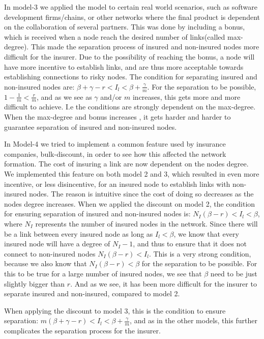 In model-3 we applied the model to certain real world scenarios, such as software development firms/chains, or other networks where the final product is dependent on the collaboration of several partners.
This was done by including a bonus, which is received when a node reach the desired number of links(called max-degree). This made the separation process of insured and non-insured nodes more difficult for the insurer. Due to the possibility of reaching the bonus, a node will have more incentive to establish links, and are thus more acceptable towards establishing connections to risky nodes. The condition for separating insured and non-insured nodes are: $\beta+\gamma-r<I_{l}<\beta+\frac{\gamma}{m}$. For the separation to be possible, $1-\frac{1}{m}<\frac{r}{m}$, and as we see as $\gamma$ and/or $m$ increases, this gets more and more difficult to achieve. 
I.e the conditions are strongly dependent on the max-degree. When the max-degree and bonus increases , it gets harder and harder to guarantee separation of insured and non-insured nodes. 

In Model-4 we tried to implement a common feature used by insurance companies, bulk-discount, in order to see how this affected the network formation. The cost of insuring a link are now dependent on the nodes degree. We implemented this feature on both model 2 and 3, which resulted in even more incentive, or less disincentive, for an insured node to establish links with non-insured nodes. The reason is intuitive since the cost of doing so decreases as the nodes degree increases. 
When we applied the discount on model 2, the condition for ensuring separation of insured and non-insured nodes is: $N_{I}(\beta-r)<I_{l}<\beta$, where $N_{I}$ represents the number of insured nodes in the network. Since there will be a link between every insured node as long as $I_{l}<\beta$, we know that every insured node will have a degree of $N_{I}-1$, and thus to ensure that it does not connect to non-insured nodes $N_{I}(\beta-r)<I_{l}$. This is a very strong condition, because we also know that $N_{I}(\beta-r)<\beta$ for the separation to be possible. For this to be true for a large number of insured nodes, we see that $\beta$ need to be just slightly bigger than $r$. And as we see, it has been more difficult for the insurer to separate insured and non-insured, compared to model 2.

When applying the discount to model 3, this is the condition to ensure separation: $m(\beta+\gamma-r)<I_{l}<\beta+\frac{\gamma}{m}$, and as in the other models, this further complicates the separation process for the insurer. 

